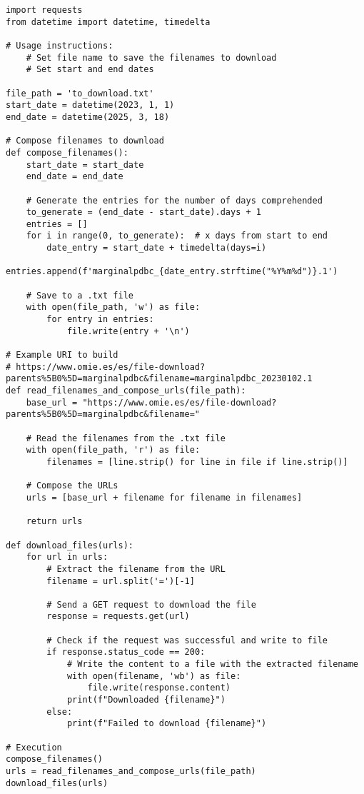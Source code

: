 \documentclass[12pt]{report} %
\begin{document}
\begin{lstlisting}
import requests
from datetime import datetime, timedelta

# Usage instructions:
    # Set file name to save the filenames to download
    # Set start and end dates

file_path = 'to_download.txt'
start_date = datetime(2023, 1, 1)
end_date = datetime(2025, 3, 18)

# Compose filenames to download
def compose_filenames():
    start_date = start_date
    end_date = end_date
    
    # Generate the entries for the number of days comprehended
    to_generate = (end_date - start_date).days + 1
    entries = []
    for i in range(0, to_generate):  # x days from start to end
        date_entry = start_date + timedelta(days=i)
        entries.append(f'marginalpdbc_{date_entry.strftime("%Y%m%d")}.1')
    
    # Save to a .txt file
    with open(file_path, 'w') as file:
        for entry in entries:
            file.write(entry + '\n')

# Example URI to build
# https://www.omie.es/es/file-download?parents%5B0%5D=marginalpdbc&filename=marginalpdbc_20230102.1
def read_filenames_and_compose_urls(file_path):
    base_url = "https://www.omie.es/es/file-download?parents%5B0%5D=marginalpdbc&filename="
    
    # Read the filenames from the .txt file
    with open(file_path, 'r') as file:
        filenames = [line.strip() for line in file if line.strip()]
    
    # Compose the URLs
    urls = [base_url + filename for filename in filenames]
    
    return urls

def download_files(urls):
    for url in urls:
        # Extract the filename from the URL
        filename = url.split('=')[-1]
        
        # Send a GET request to download the file
        response = requests.get(url)
        
        # Check if the request was successful and write to file
        if response.status_code == 200:
            # Write the content to a file with the extracted filename
            with open(filename, 'wb') as file:
                file.write(response.content)
            print(f"Downloaded {filename}")
        else:
            print(f"Failed to download {filename}")

# Execution
compose_filenames()
urls = read_filenames_and_compose_urls(file_path)
download_files(urls)
\end{lstlisting}
\end{document}

